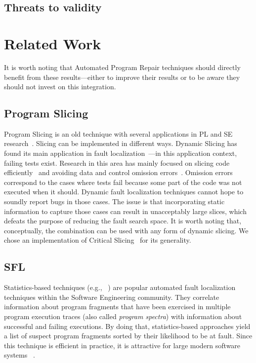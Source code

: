 \documentclass{article}
\begin{document}
\subsection{Threats to validity}


\section{Related Work}

 It is worth noting that Automated
Program Repair techniques should directly benefit from these
results---either to improve their results or to be aware they should
not invest on this integration.

\subsection{Program Slicing}

Program Slicing is an old technique with several applications in PL
and SE research~\cite{Weiser:1981:PS:800078.802557}. Slicing can be
implemented in different ways. Dynamic Slicing has found its main
application in fault
localization~\cite{Agrawal:1990:DPS:93542.93576}---in this application
context, failing tests exist. Research in this area has mainly focused
on slicing code
efficiently~\cite{Wang:2008:DSJ:1330017.1330021,Wang:2004:UCB:998675.999455}
and avoiding data and control omission
errors~\cite{Zhang:2007:TLE:1250734.1250782,Lin:2018:BDE:3238147.3238163}. Omission errors correspond to the
cases where tests fail because some part of the code was not executed
when it should. Dynamic fault localization techniques cannot hope to
soundly report bugs in those cases. The issue is that incorporating
static information to capture those cases can result in unacceptably
large slices, which defeats the purpose of reducing the fault search
space. It is worth noting that, conceptually, the \comb{} combination
can be used with any form of dynamic slicing. We chose an
implementation of Critical
Slicing~\cite{DeMillo:1996:CSS:229000.226310} for its generality.



\subsection{SFL}

Statistics-based techniques (e.g., ~\cite{Pearson:2017:EIF:3097368.3097441}) are
popular automated fault localization techniques within the Software Engineering
community. They correlate information about program fragments that have been
exercised in multiple program execution traces (also called \textit{program
spectra}) with information about successful and failing executions. By doing
that, statistics-based approaches yield a list of suspect program fragments
sorted by their likelihood to be at fault. Since this technique is efficient in
practice, it is attractive for large modern software systems ~\cite{Zoeteweij:2007:DES:1251988.1253298}.
\end{document}
